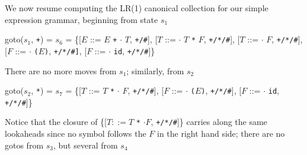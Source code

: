 \documentclass[8pt,a4paper,compress]{beamer}
\newcommand{\mm}[1]{$#1$}
\newcommand{\subs}[2]{${#1}_{#2}$}
\newenvironment{spaced}
{
\smallskip
\hspace{.5cm}
\begin{minipage}[c]{\textwidth}
}
{
\end{minipage}
\smallskip
}
\begin{document}
\begin{frame}[fragile]
\pause

We now resume computing the LR(1) canonical collection for our simple expression grammar, beginning from state $s_1$

\text{ }
\begin{spaced}
\begin{production}
goto(\subs{s}{1}, \lstinline{+}) = \subs{s}{6}
               = \{[\mm{E}  ::= \mm{E} \lstinline{+} \mm{\cdot} \mm{T}, \lstinline{+/#}],
                    [\mm{T}  ::= \mm{\cdot} \mm{T} \lstinline{*} \mm{F}, \lstinline{+/*/#}],
                    [\mm{T}  ::= \mm{\cdot} \mm{F}, \lstinline{+/*/#}],
                    [\mm{F}  ::= \mm{\cdot} \lstinline{(}\mm{E}\lstinline{)},  \lstinline{+/*/#]},
                    [\mm{F}  ::= \mm{\cdot} \lstinline{id}, \lstinline{+/*/#}]\}
\end{production}
\end{spaced}

\pause

There are no more moves from $s_1$; similarly, from $s_2$

\text{ }
\begin{spaced}
\begin{production}
goto(\subs{s}{2}, \lstinline{*}) = \subs{s}{7}
               = \{[\mm{T}  ::= \mm{T} \lstinline{*} \mm{\cdot} \mm{F}, \lstinline{+/*/#}],
                    [\mm{F}  ::= \mm{\cdot} \lstinline{(}\mm{E}\lstinline{)}, \lstinline{+/*/#}],
                    [\mm{F}  ::= \mm{\cdot} \lstinline{id}, \lstinline{+/*/#}]\}
\end{production}
\end{spaced}

\pause

Notice that the closure of  \{[$T  ::= T$ \lstinline{*} $\cdot F$, \lstinline{+/*/#}]\} carries along the same lookaheads since no symbol follows the $F$ in the right hand side; there are no gotos from $s_3$, but several from $s_4$
\end{frame}
\end{document}
